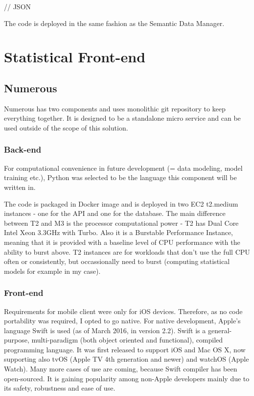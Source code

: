 // JSON

The code is deployed in the same fashion as the Semantic Data Manager.

\section{Statistical Front-end}

\subsection{Numerous}
Numerous has two components and uses monolithic git repository to keep everything together. It is designed to be a standalone micro service and can be used outside of the scope of this solution.

\subsubsection{Back-end}
For computational convenience in future development (= data modeling, model training etc.), Python was selected to be the language this component will be written in.

The code is packaged in Docker image and is deployed in two EC2 t2.medium instances - one for the API and one for the database. The main difference between T2 and M3 is the processor computational power - T2 has Dual Core Intel Xeon 3.3GHz with Turbo. Also it is a Burstable Performance Instance, meaning that it is provided with a baseline level of CPU performance with the ability to burst above. T2 instances are for workloads that don't use the full CPU often or consistently, but occassionally need to burst (computing statistical models for example in my case).

\subsubsection{Front-end}
Requirements for mobile client were only for iOS devices. Therefore, as no code portability was required, I opted to go native. For native development, Apple's language Swift is used (as of March 2016, in version 2.2). Swift is a general-purpose, multi-paradigm (both object oriented and functional), compiled programming language. It was first released to support iOS and Mac OS X, now supporting also tvOS (Apple TV 4th generation and newer) and watchOS (Apple Watch). Many more cases of use are coming, because Swift compiler has been open-sourced. It is gaining popularity among non-Apple developers mainly due to its safety, robustness and ease of use.

